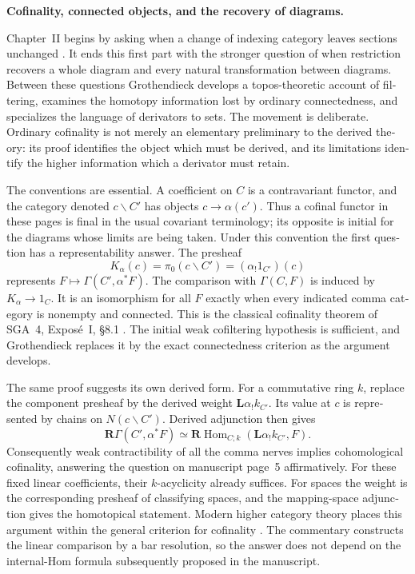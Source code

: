 \begin{otherlanguage}{english}
\begingroup
{}
\noindent\textbf{Cofinality, connected objects, and the recovery of diagrams.}

Chapter~II begins by asking when a change of indexing category leaves sections unchanged \citep{Grothendieck1990II}. It ends this first part with the stronger question of when restriction recovers a whole diagram and every natural transformation between diagrams. Between these questions Grothendieck develops a topos-theoretic account of filtering, examines the homotopy information lost by ordinary connectedness, and specializes the language of derivators to sets. The movement is deliberate. Ordinary cofinality is not merely an elementary preliminary to the derived theory: its proof identifies the object which must be derived, and its limitations identify the higher information which a derivator must retain.

The conventions are essential. A coefficient on $C$ is a contravariant functor, and the category denoted $c\backslash C'$ has objects $c\to\alpha(c')$. Thus a cofinal functor in these pages is final in the usual covariant terminology; its opposite is initial for the diagrams whose limits are being taken. Under this convention the first question has a representability answer. The presheaf
\[
 K_\alpha(c)=\pi_0(c\backslash C')= (\alpha_!1_{C'})(c)
\]
represents $F\mapsto\Gamma(C',\alpha^*F)$. The comparison with $\Gamma(C,F)$ is induced by $K_\alpha\to1_C$. It is an isomorphism for all $F$ exactly when every indicated comma category is nonempty and connected. This is the classical cofinality theorem of SGA~4, Expos\'e~I, \S8.1 \citep{SGA4I1972}. The initial weak cofiltering hypothesis is sufficient, and Grothendieck replaces it by the exact connectedness criterion as the argument develops.

The same proof suggests its own derived form. For a commutative ring $k$, replace the component presheaf by the derived weight $\mathbf L\alpha_!k_{C'}$. Its value at $c$ is represented by chains on $N(c\backslash C')$. Derived adjunction then gives
\[
 \mathbf R\Gamma(C',\alpha^*F)
 \simeq\mathbf R\operatorname{Hom}_{C;k}
       (\mathbf L\alpha_!k_{C'},F).
\]
Consequently weak contractibility of all the comma nerves implies cohomological cofinality, answering the question on manuscript page~5 affirmatively. For these fixed linear coefficients, their $k$-acyclicity already suffices. For spaces the weight is the corresponding presheaf of classifying spaces, and the mapping-space adjunction gives the homotopical statement. Modern higher category theory places this argument within the general criterion for cofinality \citep[Theorem~4.1.3.1]{Lurie2009HTT}. The commentary constructs the linear comparison by a bar resolution, so the answer does not depend on the internal-Hom formula subsequently proposed in the manuscript.


\end{otherlanguage}
